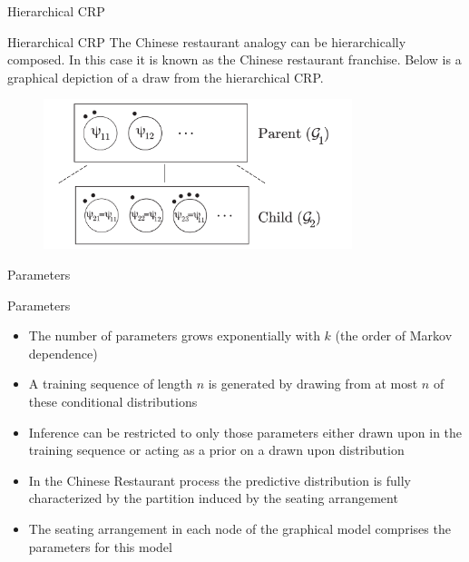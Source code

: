 \documentclass{beamer}
\begin{document}
\begin{frame}[t]{Hierarchical CRP}

	\begin{block}{Hierarchical CRP}
		The Chinese restaurant analogy can be hierarchically composed.  In this case it is known as the Chinese restaurant franchise.  Below is a graphical depiction of a draw from the hierarchical CRP.
	\end{block}
	
		\begin{figure}[t]
		\begin{center}
			\includegraphics[width = 9cm]{../figs/figure1.pdf}
		\end{center}
	\end{figure}
\end{frame}

\begin{frame}[t]{Parameters}
	\begin{block}{Parameters}
		\begin{itemize}
			\item The number of parameters grows exponentially with $k$ (the order of Markov dependence)
			\item A training sequence of length $n$ is generated by drawing from at most $n$ of these conditional distributions
			\item Inference can be restricted to only those parameters either drawn upon in the training sequence or acting as a prior on a drawn upon distribution
			\item In the Chinese Restaurant process the predictive distribution is fully characterized by the partition induced by the seating arrangement
			\item The seating arrangement in each node of the graphical model comprises the  parameters for this model
		\end{itemize}
	\end{block}	
\end{frame}
\end{document}
